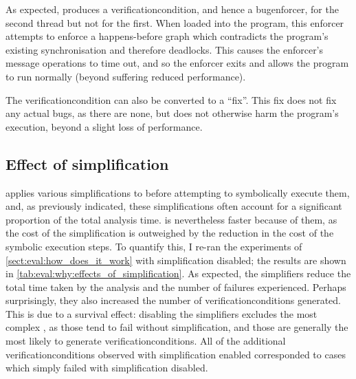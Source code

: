 As expected, {\technique} produces a \gls{verificationcondition}, and
hence a \gls{bugenforcer}, for the second thread but not for the
first.  When loaded into the program, this enforcer attempts to
enforce a happens-before graph which contradicts the program's
existing synchronisation and therefore deadlocks.  This causes the
enforcer's message operations to time out, and so the enforcer exits
and allows the program to run normally (beyond suffering reduced
performance).

The \gls{verificationcondition} can also be converted to a ``fix''.
This fix does not fix any actual bugs, as there are none, but does not
otherwise harm the program's execution, beyond a slight loss of
performance.

\subsection{Effect of {\StateMachine} simplification}

{\Technique} applies various simplifications to {\StateMachines}
before attempting to symbolically execute them, and, as previously
indicated, these simplifications often account for a significant
proportion of the total analysis time.  {\Technique} is nevertheless
faster because of them, as the cost of the simplification is
outweighed by the reduction in the cost of the symbolic execution
steps.  To quantify this, I re-ran the experiments of
\autoref{sect:eval:how_does_it_work} with {\StateMachine}
simplification disabled; the results are shown in
\autoref{tab:eval:why:effects_of_simplification}.  As expected, the
simplifiers reduce the total time taken by the analysis and the number
of failures experienced.  Perhaps surprisingly, they also increased
the number of \glspl{verificationcondition} generated.  This is due to
a survival effect: disabling the simplifiers excludes the most complex
{\StateMachines}, as those tend to fail without simplification, and
those are generally the most likely to generate
\glspl{verificationcondition}.  All of the additional
\glspl{verificationcondition} observed with simplification enabled
corresponded to cases which simply failed with simplification
disabled.

